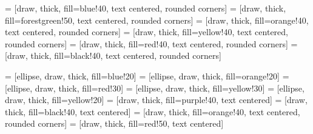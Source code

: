 
  \hspace*{-.5in}
  \begin{minipage}{5in}
  \begin{center}

      \begin{minipage}{4.5in}

     = [draw, thick, fill=blue!40, text centered, rounded corners]
     = [draw, thick, fill=forestgreen!50, text centered, rounded corners]
     = [draw, thick, fill=orange!40, text centered, rounded corners]
     = [draw, thick, fill=yellow!40, text centered, rounded corners]
     = [draw, thick, fill=red!40, text centered, rounded corners]
     = [draw, thick, fill=black!40, text centered, rounded corners]

     = [ellipse, draw, thick, fill=blue!20]
     = [ellipse, draw, thick, fill=orange!20]
     = [ellipse, draw, thick, fill=red!30]
     = [ellipse, draw, thick, fill=yellow!30]
     = [ellipse, draw, thick, fill=yellow!20]
     = [draw, thick, fill=purple!40, text centered]  
     = [draw, thick, fill=black!40, text centered]
     = [draw, thick, fill=orange!40, text centered, rounded corners]    
     = [draw, thick, fill=red!50, text centered]    

    \begin{figure}

    \begin{center}

\end{center}
\end{figure}
\end{minipage}
\end{center}
\end{minipage}
